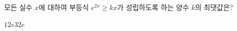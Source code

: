 모든 실수 $x$에 대하여 부등식 $e^{2x}\ge kx$가 성립하도록 하는 양수 $k$의 최댓값은?
\begin{choices32}{$1$}{$2$}{$e$}{$3$}{$2e$}\end{choices32}
